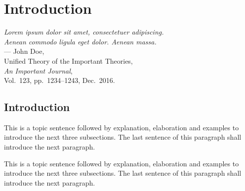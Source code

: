 

%
%
\chapter{Introduction}
\label{ch:introduction}

\begin{flushright}
{\slshape Lorem ipsum dolor sit amet, consectetuer adipiscing.}\\
{\slshape Aenean commodo ligula eget dolor. Aenean massa.}\\
\medskip
--- John Doe,\\
Unified Theory of the Important Theories,\\
{\slshape An Important Journal},\\
Vol.~123, pp.~1234--1243, Dec.~2016.\\
\end{flushright}

\bigskip




\section{Introduction}
\label{sec:ch_1_introduction}

This is a topic sentence followed by explanation, elaboration and examples to introduce the next three subsections. The last sentence of this paragraph shall introduce the next paragraph. \lipsum[1]

This is a topic sentence followed by explanation, elaboration and examples to introduce the next three subsections. The last sentence of this paragraph shall introduce the next paragraph. \lipsum[1]

